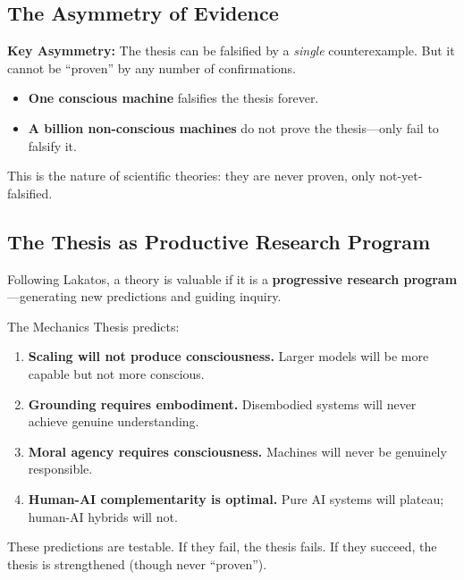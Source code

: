 \subsection{The Asymmetry of Evidence}

\begin{tcolorbox}[colback=yellow!5!white, colframe=yellow!75!black]
\textbf{Key Asymmetry:} The thesis can be falsified by a \textit{single} counterexample. But it cannot be ``proven'' by any number of confirmations.

\begin{itemize}[nosep]
    \item \textbf{One conscious machine} falsifies the thesis forever.
    \item \textbf{A billion non-conscious machines} do not prove the thesis---only fail to falsify it.
\end{itemize}

This is the nature of scientific theories: they are never proven, only not-yet-falsified.
\end{tcolorbox}

\subsection{The Thesis as Productive Research Program}

Following Lakatos, a theory is valuable if it is a \textbf{progressive research program}---generating new predictions and guiding inquiry.

The Mechanics Thesis predicts:
\begin{enumerate}
    \item \textbf{Scaling will not produce consciousness.} Larger models will be more capable but not more conscious.
    \item \textbf{Grounding requires embodiment.} Disembodied systems will never achieve genuine understanding.
    \item \textbf{Moral agency requires consciousness.} Machines will never be genuinely responsible.
    \item \textbf{Human-AI complementarity is optimal.} Pure AI systems will plateau; human-AI hybrids will not.
\end{enumerate}

These predictions are testable. If they fail, the thesis fails. If they succeed, the thesis is strengthened (though never ``proven'').

